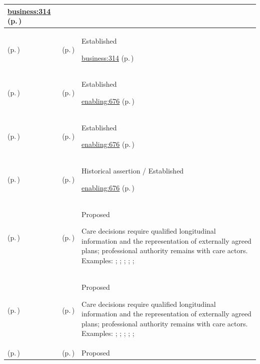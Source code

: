 \begin{longtable}{|>{\raggedright\arraybackslash}p{0.27\TableWidth}|>{\raggedright\arraybackslash}p{0.27\TableWidth}|>{\raggedright\arraybackslash}p{0.46\TableWidth}|}
 \hyperref[rad:business:314]{business:314} (p.\,\pageref{rad:business:314})\\\hline
\nameref{cap:bc-individual-care-review} (p.\,\pageref{cap:bc-individual-care-review}) & \nameref{cap:bec-health-information-access} (p.\,\pageref{cap:bec-health-information-access}) & Established

 \hyperref[rad:business:314]{business:314} (p.\,\pageref{rad:business:314})\\\hline
\nameref{cap:bc-health-service-assurance} (p.\,\pageref{cap:bc-health-service-assurance}) & \nameref{cap:bec-assurance-design} (p.\,\pageref{cap:bec-assurance-design}) & Established

 \hyperref[rad:enabling:676]{enabling:676} (p.\,\pageref{rad:enabling:676})\\\hline
\nameref{cap:bc-health-service-assurance} (p.\,\pageref{cap:bc-health-service-assurance}) & \nameref{cap:bec-assurance-criteria-management} (p.\,\pageref{cap:bec-assurance-criteria-management}) & Established

 \hyperref[rad:enabling:676]{enabling:676} (p.\,\pageref{rad:enabling:676})\\\hline
\nameref{cap:bc-health-service-assurance} (p.\,\pageref{cap:bc-health-service-assurance}) & \nameref{cap:bec-governed-assurance} (p.\,\pageref{cap:bec-governed-assurance}) & Historical assertion / Established

 \hyperref[rad:enabling:676]{enabling:676} (p.\,\pageref{rad:enabling:676})\\\hline
\nameref{cap:bc-individual-care-delivery} (p.\,\pageref{cap:bc-individual-care-delivery}) & \nameref{cap:bec-patient-clinical-record} (p.\,\pageref{cap:bec-patient-clinical-record}) & Proposed

Care decisions require qualified longitudinal information and the representation of externally agreed plans; professional authority remains with care actors. Examples: \nameref{feature:feat-ise-01}; \nameref{feature:feat-ise-02}; \nameref{feature:feat-ise-03}; \nameref{function:assemble-longitudinal-clinical-record}; \nameref{service:longitudinal-clinical-record-query}; \nameref{function:maintain-active-clinical-record}\\\hline
\nameref{cap:bc-individual-care-delivery} (p.\,\pageref{cap:bc-individual-care-delivery}) & \nameref{cap:bec-care-plan-administration} (p.\,\pageref{cap:bec-care-plan-administration}) & Proposed

Care decisions require qualified longitudinal information and the representation of externally agreed plans; professional authority remains with care actors. Examples: \nameref{feature:feat-sa-26}; \nameref{function:receive-care-plan}; \nameref{service:care-plan-ingress}; \nameref{function:associate-care-plan-context}; \nameref{service:care-plan-context-query}; \nameref{function:distribute-care-plan-change}\\\hline
\nameref{cap:bc-care-access-management} (p.\,\pageref{cap:bc-care-access-management}) & \nameref{cap:bec-referral-administration} (p.\,\pageref{cap:bec-referral-administration}) & Proposed


\end{longtable}
